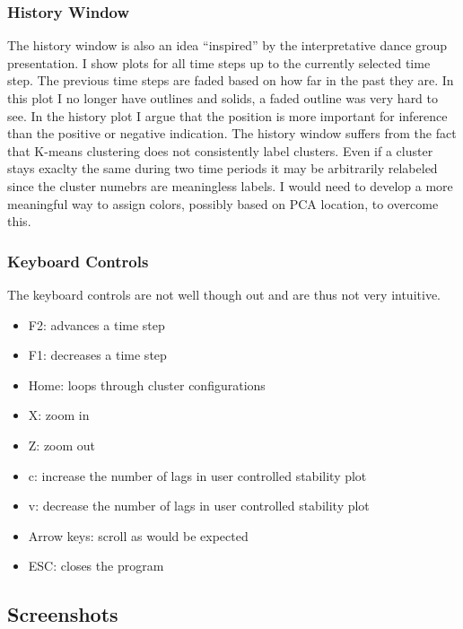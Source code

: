 \documentclass{article}
\begin{document}
\begin{multicols}{2}
\subsubsection{History Window}
The history window is also an idea ``inspired'' by the interpretative dance group presentation.  I show plots for all time steps up to the currently selected time step.  The previous time steps are faded based on how far in the past they are.  In this plot I no longer have outlines and solids, a faded outline was very hard to see.  In the history plot I argue that the position is more important for inference than the positive or negative indication.  The history window suffers from the fact that K-means clustering does not consistently label clusters.  Even if a cluster stays exaclty the same during two time periods it may be arbitrarily relabeled since the cluster numebrs are meaningless labels.  I would need to develop a more meaningful way to assign colors, possibly based on PCA location, to overcome this.

\subsubsection{Keyboard Controls}
The keyboard controls are not well though out and are thus not very intuitive.

\begin{itemize}
	\item F2: advances a time step
	\item F1: decreases a time step
	\item Home: loops through cluster configurations
	\item X: zoom in
	\item Z: zoom out
	\item c: increase the number of lags in user controlled stability plot
	\item v: decrease the number of lags in user controlled stability plot
	\item Arrow keys: scroll as would be expected
	\item ESC: closes the program
\end{itemize}

\subsection{Screenshots}




\end{multicols}
\end{document}
